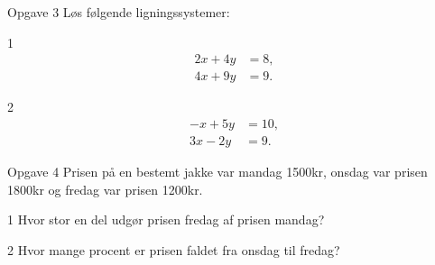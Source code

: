\begin{opgavetekst}{Opgave 3}
	Løs følgende ligningssystemer:
\end{opgavetekst}
\begin{delopgave}{}{1}
	\begin{align*}
		2x+4y &= 8,\\
		4x+9y &= 9.
	\end{align*}
\end{delopgave}
\begin{delopgave}{}{2}
	\begin{align*}
		-x+5y &= 10,\\
		3x-2y &= 9.
	\end{align*}
\end{delopgave}
\begin{opgavetekst}{Opgave 4}
	Prisen på en bestemt jakke var mandag 1500kr, onsdag var prisen 1800kr og fredag var prisen 1200kr.
\end{opgavetekst}
	\begin{delopgave}{}{1}
		Hvor stor en del udgør prisen fredag af prisen mandag?
	\end{delopgave}
	\begin{delopgave}{}{2}
		Hvor mange procent er prisen faldet fra onsdag til fredag?
	\end{delopgave}

